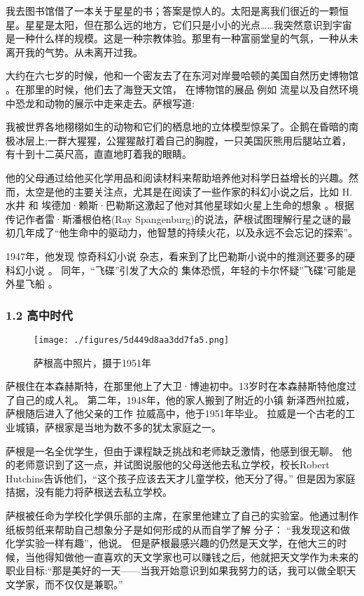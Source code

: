 我去图书馆借了一本关于星星的书；答案是惊人的。太阳是离我们很近的一颗恒星。星星是太阳，但在那么远的地方，它们只是小小的光点……我突然意识到宇宙是一种什么样的规模。这是一种宗教体验。那里有一种富丽堂皇的气氛，一种从未离开我的气势。从未离开过我。

大约在六七岁的时候，他和一个密友去了在东河对岸曼哈顿的美国自然历史博物馆 。在那里的时候，他们去了海登天文馆， 在博物馆的展品 例如 流星以及自然环境中恐龙和动物的展示中走来走去。萨根写道:

我被世界各地栩栩如生的动物和它们的栖息地的立体模型惊呆了。企鹅在昏暗的南极冰层上;一群大猩猩，公猩猩敲打着自己的胸膛，一只美国灰熊用后腿站立着，有十到十二英尺高，直直地盯着我的眼睛。

他的父母通过给他买化学用品和阅读材料来帮助培养他对科学日益增长的兴趣。然而，太空是他的主要关注点，尤其是在阅读了一些作家的科幻小说之后，比如 H.水井 和 埃德加·赖斯·巴勒斯这激起了他对其他星球如火星上生命的想象 。根据传记作者雷·斯潘根伯格(Ray Spangenburg)的说法，萨根试图理解行星之谜的最初几年成了“他生命中的驱动力，他智慧的持续火花，以及永远不会忘记的探索”。

1947年，他发现 惊奇科幻小说 杂志，看来到了比巴勒斯小说中的推测还要多的硬科幻小说 。 同年，“飞碟”引发了大众的 集体恐慌，年轻的卡尔怀疑”飞碟"可能是外星飞船 。
\subsubsection{1.2 高中时代}
\begin{figure}[ht]
\centering
\texttt{[image: ./figures/5d449d8aa3dd7fa5.png]}
\caption{萨根高中照片，摄于1951年} \label{fig_Sagan_1}
\end{figure}
萨根住在本森赫斯特，在那里他上了大卫·博迪初中。13岁时在本森赫斯特他度过了自己的成人礼。 第二年，1948年，他的家人搬到了附近的小镇 新泽西州拉威，萨根随后进入了他父亲的工作 拉威高中，他于1951年毕业。 拉威是一个古老的工业城镇，萨根家是当地为数不多的犹太家庭之一。

萨根是一名全优学生，但由于课程缺乏挑战和老师缺乏激情，他感到很无聊。 他的老师意识到了这一点，并试图说服他的父母送他去私立学校，校长Robert Hutchins告诉他们，“这个孩子应该去天才儿童学校，他天分了得。” 但是因为家庭拮据，没有能力将萨根送去私立学校。

萨根被任命为学校化学俱乐部的主席，在家里他建立了自己的实验室。他通过制作纸板剪纸来帮助自己想象分子是如何形成的从而自学了解 分子： “我发现这和做化学实验一样有趣”，他说。 但是萨根最感兴趣的仍然是天文学，在他大三的时候，当他得知做他一直喜欢的天文学家也可以赚钱之后，他就把天文学作为未来的职业目标:“那是美好的一天——当我开始意识到如果我努力的话，我可以做全职天文学家，而不仅仅是兼职。”

